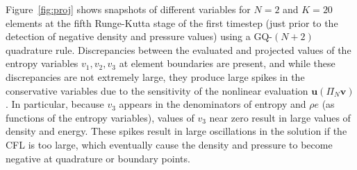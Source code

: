 \documentclass[preprint,10pt]{elsarticle}
\theoremstyle{definition}
\theoremstyle{lemma}
\theoremstyle{theorem}
\theoremstyle{assumption}
\newcommand{\LRp}[1]{\left( #1 \right)}
\begin{document}
Figure~\ref{fig:proj} shows snapshots of different variables for $N=2$ and $K = 20$ elements at the fifth Runge-Kutta stage of the first timestep (just prior to the detection of negative density and pressure values) using a GQ-$(N+2)$ quadrature rule.  Discrepancies between the evaluated and projected values of the entropy variables $v_1, v_2, v_3$ at element boundaries are present, and while these discrepancies are not extremely large, they produce large spikes in the conservative variables due to the sensitivity of the nonlinear evaluation $\bm{u}\LRp{\Pi_N \bm{v}}$.  In particular, because $v_3$ appears in the denominators of entropy and $\rho e$ (as functions of the entropy variables), values of $v_3$ near zero result in large values of density and energy.  These spikes result in large oscillations in the solution if the CFL is too large, which eventually cause the density and pressure to become negative at quadrature or boundary points.  %
\end{document}
